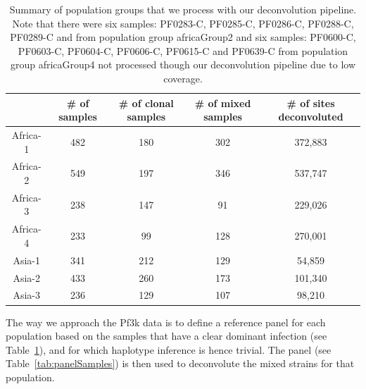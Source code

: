 \documentclass{article}
\begin{document}
\begin{table}[ht]
\centering
\begin{tabular}{|c|c|c|c|c|}
\hline\hline
        & \# of samples  & \# of clonal samples & \# of mixed samples & \# of sites deconvoluted\\
        \hline
Africa-1 & 482 & 180 & 302 & 372,883 \\
Africa-2 & 549 & 197 & 346 & 537,747 \\
Africa-3	& 238 & 147 & 91  & 229,026 \\
Africa-4	& 233 & 99  & 128 & 270,001 \\
Asia-1	  & 341 & 212 & 129 & 54,859  \\
Asia-2	  & 433 & 260 & 173 & 101,340 \\
Asia-3	  & 236 & 129 & 107 & 98,210  \\
\hline
\hline
\end{tabular}
\caption{Summary of population groups that we process with our deconvolution pipeline. Note that there were six samples: PF0283-C, PF0285-C, PF0286-C, PF0288-C, PF0289-C and from population group africaGroup2 and six samples: PF0600-C, PF0603-C, PF0604-C, PF0606-C, PF0615-C and PF0639-C from population group africaGroup4 not processed though our deconvolution pipeline due to low coverage.}\label{tab:sevenGroups}
\end{table}

The way we approach the Pf3k data is to define a reference panel for each population based on the samples that have a clear dominant infection (see Table~\ref{tab:sevenGroups}), and for which haplotype inference is hence trivial. The panel (see Table~\ref{tab:panelSamples}) is then used to deconvolute the mixed strains for that population.
\end{document}
